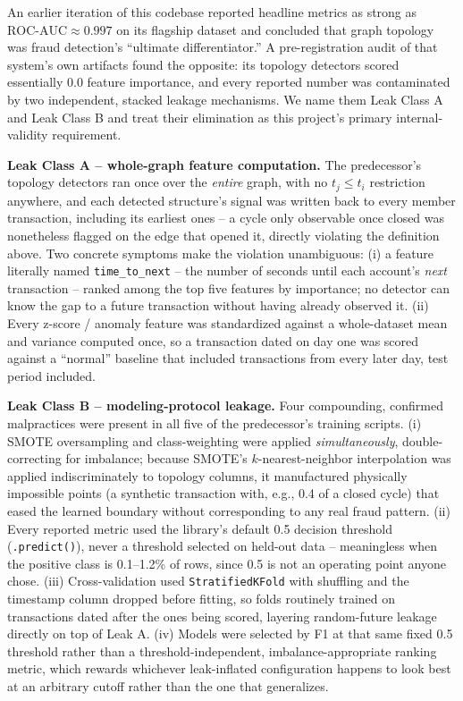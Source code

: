 An earlier iteration of this codebase reported headline metrics as strong
as $\mathrm{ROC\text{-}AUC} \approx 0.997$ on its flagship dataset and
concluded that graph topology was fraud detection's ``ultimate
differentiator.'' A pre-registration audit of that system's own artifacts
found the opposite: its topology detectors scored essentially 0.0 feature
importance, and every reported number was contaminated by two independent,
stacked leakage mechanisms. We name them Leak Class A and Leak Class B and
treat their elimination as this project's primary internal-validity
requirement.

\textbf{Leak Class A -- whole-graph feature computation.} The predecessor's
topology detectors ran once over the \emph{entire} graph, with no
$t_j \le t_i$ restriction anywhere, and each detected structure's signal
was written back to every member transaction, including its earliest ones
-- a cycle only observable once closed was nonetheless flagged on the edge
that opened it, directly violating the definition above. Two concrete
symptoms make the violation unambiguous: (i) a feature literally named
\texttt{time\_to\_next} -- the number of seconds until each account's
\emph{next} transaction -- ranked among the top five features by
importance; no detector can know the gap to a future transaction without
having already observed it. (ii) Every z-score / anomaly feature was
standardized against a whole-dataset mean and variance computed once, so a
transaction dated on day one was scored against a ``normal'' baseline that
included transactions from every later day, test period included.

\textbf{Leak Class B -- modeling-protocol leakage.} Four compounding,
confirmed malpractices were present in all five of the predecessor's
training scripts. (i) SMOTE oversampling and class-weighting were applied
\emph{simultaneously}, double-correcting for imbalance; because SMOTE's
$k$-nearest-neighbor interpolation was applied indiscriminately to
topology columns, it manufactured physically impossible points (a
synthetic transaction with, e.g., 0.4 of a closed cycle) that eased the
learned boundary without corresponding to any real fraud pattern. (ii)
Every reported metric used the library's default 0.5 decision threshold
(\texttt{.predict()}), never a threshold selected on held-out data --
meaningless when the positive class is 0.1--1.2\% of rows, since 0.5 is
not an operating point anyone chose. (iii) Cross-validation used
\texttt{StratifiedKFold} with shuffling and the timestamp column dropped
before fitting, so folds routinely trained on transactions dated after the
ones being scored, layering random-future leakage directly on top of Leak
A. (iv) Models were selected by F1 at that same fixed 0.5 threshold rather
than a threshold-independent, imbalance-appropriate ranking metric, which
rewards whichever leak-inflated configuration happens to look best at an
arbitrary cutoff rather than the one that generalizes.

